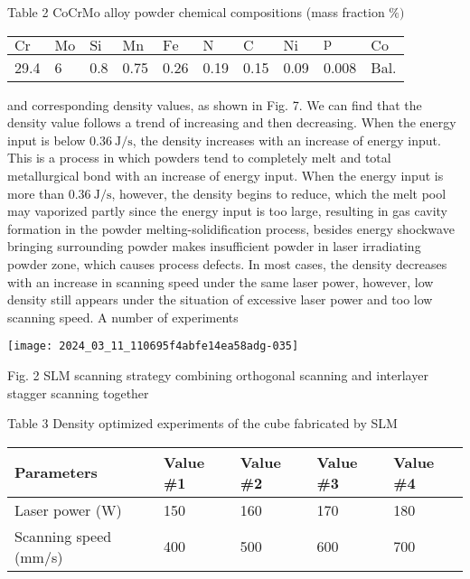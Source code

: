 \documentclass[10pt]{article}
\begin{document}
Table 2 CoCrMo alloy powder chemical compositions (mass fraction $\%)$

\begin{center}
\begin{tabular}{llllllllll}
\hline
$\mathrm{Cr}$ & $\mathrm{Mo}$ & $\mathrm{Si}$ & $\mathrm{Mn}$ & $\mathrm{Fe}$ & $\mathrm{N}$ & $\mathrm{C}$ & $\mathrm{Ni}$ & $\mathrm{p}$ & $\mathrm{Co}$ \\
\hline
29.4 & 6 & 0.8 & 0.75 & 0.26 & 0.19 & 0.15 & 0.09 & 0.008 & Bal. \\
\hline
\end{tabular}
\end{center}

and corresponding density values, as shown in Fig. 7. We can find that the density value follows a trend of increasing and then decreasing. When the energy input is below $0.36 \mathrm{~J} / \mathrm{s}$, the density increases with an increase of energy input. This is a process in which powders tend to completely melt and total metallurgical bond with an increase of energy input. When the energy input is more than $0.36 \mathrm{~J} / \mathrm{s}$, however, the density begins to reduce, which the melt pool may vaporized partly since the energy input is too large, resulting in gas cavity formation in the powder melting-solidification process, besides energy shockwave bringing surrounding powder makes insufficient powder in laser irradiating powder zone, which causes process defects. In most cases, the density decreases with an increase in scanning speed under the same laser power, however, low density still appears under the situation of excessive laser power and too low scanning speed. A number of experiments

\begin{center}
\texttt{[image: 2024\_03\_11\_110695f4abfe14ea58adg-035]}
\end{center}

Fig. 2 SLM scanning strategy combining orthogonal scanning and interlayer stagger scanning together

Table 3 Density optimized experiments of the cube fabricated by SLM

\begin{center}
\begin{tabular}{lllll}
\hline
Parameters & Value \#1 & Value \#2 & Value \#3 & Value \#4 \\
\hline
Laser power (W) & 150 & 160 & 170 & 180 \\
Scanning speed (mm/s) & 400 & 500 & 600 & 700 \\
\hline
\end{tabular}
\end{center}
\end{document}
